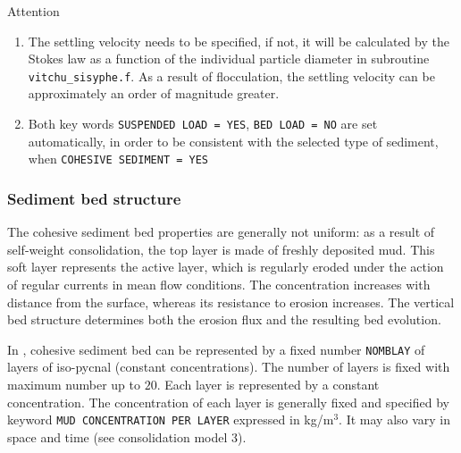 \begin{bclogo}[couleur = blue!10, arrondi = 0.10, logo = \bcattention]{\textsf{Attention}}
\begin{enumerate}
\item The settling velocity needs to be specified, if not, it will
be calculated by the Stokes law as a function of the individual particle
diameter in subroutine \texttt{vitchu\_sisyphe.f}. As a result of flocculation, the
settling velocity can be approximately an order of magnitude greater. 

\item Both key words \texttt{SUSPENDED LOAD = YES}, \texttt{BED LOAD = NO} are
set automatically, in order to be consistent with the selected type of
sediment, when \texttt{COHESIVE SEDIMENT = YES}
\end{enumerate}
\end{bclogo}

\subsubsection{Sediment bed structure}

The cohesive sediment bed properties are generally not uniform: as a result
of self-weight consolidation, the top layer is made of freshly deposited
mud. This soft layer represents the active layer, which is regularly eroded
under the action of regular currents in mean flow conditions. The
concentration increases with distance from the surface, whereas its
resistance to erosion increases. The vertical bed structure determines both
the erosion flux and the resulting bed evolution. 

In \sisyphe, cohesive sediment bed can be represented by a fixed number
\texttt{NOMBLAY} of layers of iso-pycnal (constant concentrations). The number of
layers is fixed with maximum number up to $20$. Each layer is represented by a
constant concentration. The concentration of each layer is generally fixed
and specified by keyword \texttt{MUD CONCENTRATION PER LAYER} expressed in kg/m$^3$. It
may also vary in space and time (see consolidation model 3).


